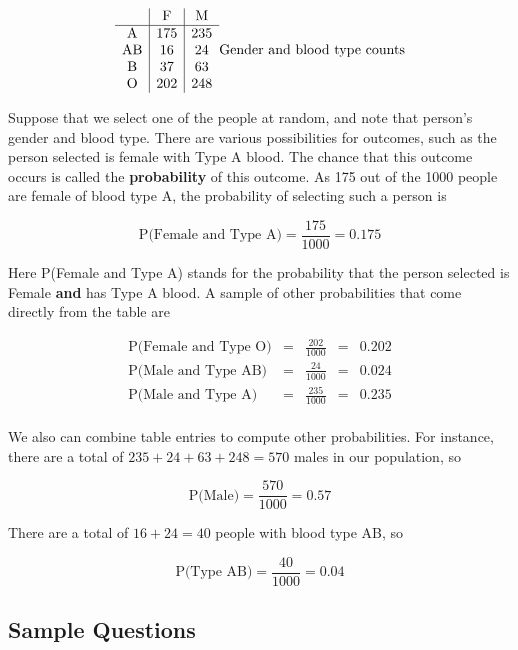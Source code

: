 \documentclass[
]{book}
\begin{document}
\[
\begin{array}{c|c|c}
           & \mathrm{F} & \mathrm{M}\\ \hline
\mathrm{A} & 175 & 235 \\ 
\mathrm{AB} & 16 & 24 \\ 
\mathrm{B} & 37 & 63 \\ 
\mathrm{O} & 202 & 248 \\ 
\end{array}\\
\mbox{Gender and blood type counts}
\]

Suppose that we select one of the people at random, and note that person's gender and blood type. There are various possibilities for outcomes, such as the person selected is female with Type A blood. The chance that this outcome occurs is called the \textbf{probability} of this outcome. As 175 out
of the 1000 people are female of blood type A, the probability of selecting such a person is

\[\mbox{P(Female and Type A)} = \frac{175}{1000} = 0.175\]

Here P(Female and Type A) stands for the probability that the person
selected is Female \textbf{and} has Type A blood. A sample of other probabilities
that come directly from the table are

\[
\begin{array}{rcccl}
\mbox{P(Female and Type O)} & = & {\displaystyle\frac{202}{1000}} & = & 0.202 \\[5pt]
\mbox{P(Male and Type AB)} & = & {\displaystyle\frac{24}{1000}} & = & 0.024 \\[5pt]
\mbox{P(Male and Type A)} & = & {\displaystyle\frac{235}{1000}} & = & 0.235 \\
\end{array}
\]

We also can combine table entries to compute other probabilities. For
instance, there are a total of \(235 + 24 + 63 + 248 = 570\) males in
our population, so

\[
\mbox{P(Male)} = \frac{570}{1000} = 0.57
\]

There are a total of \(16 + 24 = 40\) people with blood type AB, so

\[
\mbox{P(Type AB)} = \frac{40}{1000} = 0.04
\]

\hypertarget{sample-questions}{%
\subsection{Sample Questions}\label{sample-questions}}
\end{document}

